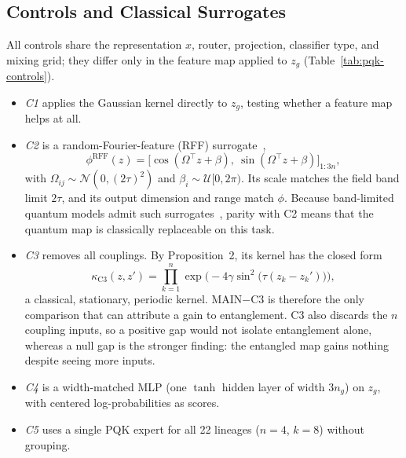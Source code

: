 \documentclass[conference]{IEEEtran}
\begin{document}
\subsection{Controls and Classical Surrogates}
\label{sec:controls}

All controls share the representation $x$, router, projection, classifier type, and mixing grid; they differ only in the feature map applied to $z_g$ (Table~\ref{tab:pqk-controls}).
\begin{itemize}
    \item \textit{C1} applies the Gaussian kernel directly to $z_g$, testing whether a feature map helps at all.
    \item \textit{C2} is a random-Fourier-feature (RFF) surrogate~\cite{rahimi2007rff,schreiber2023surrogates,sweke2023rff},
    \begin{equation}
        \phi^{\mathrm{RFF}}(z)=\big[\cos(\Omega^{\top}z+\beta),\ \sin(\Omega^{\top}z+\beta)\big]_{1:3n},
    \end{equation}
    with $\Omega_{ij}\sim\mathcal{N}(0,(2\tau)^2)$ and $\beta_i\sim\mathcal{U}[0,2\pi)$. Its scale matches the field band limit $2\tau$, and its output dimension and range match $\phi$. Because band-limited quantum models admit such surrogates~\cite{schreiber2023surrogates}, parity with C2 means that the quantum map is classically replaceable on this task.
    \item \textit{C3} removes all couplings. By Proposition~2, its kernel has the closed form
    \begin{equation}
        \kappa_{\mathrm{C3}}(z,z')=\prod_{k=1}^{n}\exp\!\big(-4\gamma\sin^2\!\big(\tau(z_k-z_k')\big)\big),
        \label{eq:c3-kernel}
    \end{equation}
    a classical, stationary, periodic kernel. MAIN$-$C3 is therefore the only comparison that can attribute a gain to entanglement. C3 also discards the $n$ coupling inputs, so a positive gap would not isolate entanglement alone, whereas a null gap is the stronger finding: the entangled map gains nothing despite seeing more inputs.
    \item \textit{C4} is a width-matched MLP (one $\tanh$ hidden layer of width $3n_g$) on $z_g$, with centered log-probabilities as scores.
    \item \textit{C5} uses a single PQK expert for all 22 lineages ($n=4$, $k=8$) without grouping.
\end{itemize}
\end{document}
